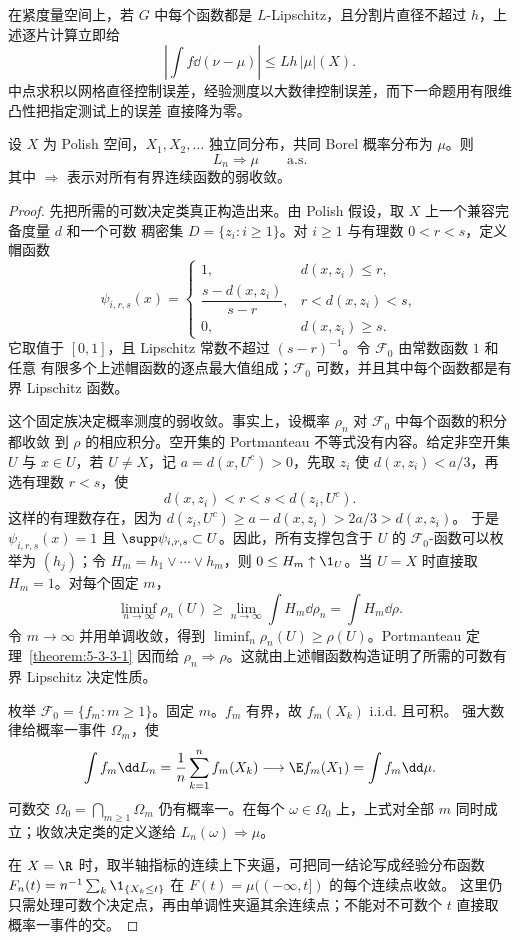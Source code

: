 在紧度量空间上，若 $G$ 中每个函数都是 $L$-Lipschitz，且分割片直径不超过 $h$，上述逐片计算立即给
\begin{equation}\label{eq:7-4-2-lipschitz-atomic-error}
 \left|\int f\dd(\nu-\mu)\right|
 \le Lh\,|\mu|(X).
\end{equation}
中点求积以网格直径控制误差，经验测度以大数律控制误差，而下一命题用有限维凸性把指定测试上的误差
直接降为零。

\begin{theorem}[经验测度强一致性]\label{theorem:7-4-2-3}
设 $X$ 为 Polish 空间，$X_1,X_2,\ldots$ 独立同分布，共同 Borel 概率分布为 $\mu$。则
\[
 L_n\Rightarrow\mu\qquad\text{a.s.}
\]
其中 $\Rightarrow$ 表示对所有有界连续函数的弱收敛。
\end{theorem}

\begin{proof}
先把所需的可数决定类真正构造出来。由 Polish 假设，取 $X$ 上一个兼容完备度量 $d$ 和一个可数
稠密集 $D=\{z_i:i\geq1\}$。对 $i\geq1$ 与有理数 $0<r<s$，定义帽函数
\[
 \psi_{i,r,s}(x)=
 \begin{cases}
  1,&d(x,z_i)\leq r,\\
  \dfrac{s-d(x,z_i)}{s-r},&r<d(x,z_i)<s,\\
  0,&d(x,z_i)\geq s.
 \end{cases}
\]
它取值于 $[0,1]$，且 Lipschitz 常数不超过 $(s-r)^{-1}$。令 $\mathcal F_0$ 由常数函数 $1$ 和任意
有限多个上述帽函数的逐点最大值组成；$\mathcal F_0$ 可数，并且其中每个函数都是有界 Lipschitz
函数。

这个固定族决定概率测度的弱收敛。事实上，设概率 $\rho_n$ 对 $\mathcal F_0$ 中每个函数的积分都收敛
到 $\rho$ 的相应积分。空开集的 Portmanteau 不等式没有内容。给定非空开集 $U$ 与 $x\in U$，若
$U\neq X$，记 $a=d(x,U^c)>0$，先取 $z_i$ 使 $d(x,z_i)<a/3$，再选有理数
$r<s$，使
\[
 d(x,z_i)<r<s<d(z_i,U^c).
\]
这样的有理数存在，因为
$d(z_i,U^c)\geq a-d(x,z_i)>2a/3>d(x,z_i)$。
于是 $\psi_{i,r,s}(x)=1$ 且 $\supp\psi_{i,r,s}\subset U$。因此，所有支撑包含于 $U$ 的
$\mathcal F_0$-函数可以枚举为 $(h_j)$；令 $H_m=h_1\vee\cdots\vee h_m$，则
$0\leq H_m\uparrow\1_U$。当 $U=X$ 时直接取 $H_m=1$。对每个固定 $m$，
\[
 \liminf_{n\to\infty}\rho_n(U)
 \geq\lim_{n\to\infty}\int H_m\dd\rho_n
 =\int H_m\dd\rho.
\]
令 $m\to\infty$ 并用单调收敛，得到
$\liminf_n\rho_n(U)\geq\rho(U)$。Portmanteau 定理~\ref{theorem:5-3-3-1} 因而给
$\rho_n\Rightarrow\rho$。这就由上述帽函数构造证明了所需的可数有界 Lipschitz 决定性质。

枚举 $\mathcal F_0=\{f_m:m\geq1\}$。固定 $m$。$f_m$ 有界，故 $f_m(X_k)$ i.i.d. 且可积。
强大数律给概率一事件 $\Omega_m$，使
\[
 \int f_m\dd L_n
 =\frac1n\sum_{k=1}^nf_m(X_k)
 \longrightarrow\E f_m(X_1)=\int f_m\dd\mu.
\]
可数交 $\Omega_0=\bigcap_{m\ge1}\Omega_m$ 仍有概率一。在每个
$\omega\in\Omega_0$ 上，上式对全部 $m$ 同时成立；收敛决定类的定义遂给
$L_n(\omega)\Rightarrow\mu$。

在 $X=\R$ 时，取半轴指标的连续上下夹逼，可把同一结论写成经验分布函数
$F_n(t)=n^{-1}\sum_k\1_{\{X_k\le t\}}$ 在 $F(t)=\mu(( -\infty,t])$ 的每个连续点收敛。
这里仍只需处理可数个决定点，再由单调性夹逼其余连续点；不能对不可数个 $t$ 直接取概率一事件的交。
\end{proof}

